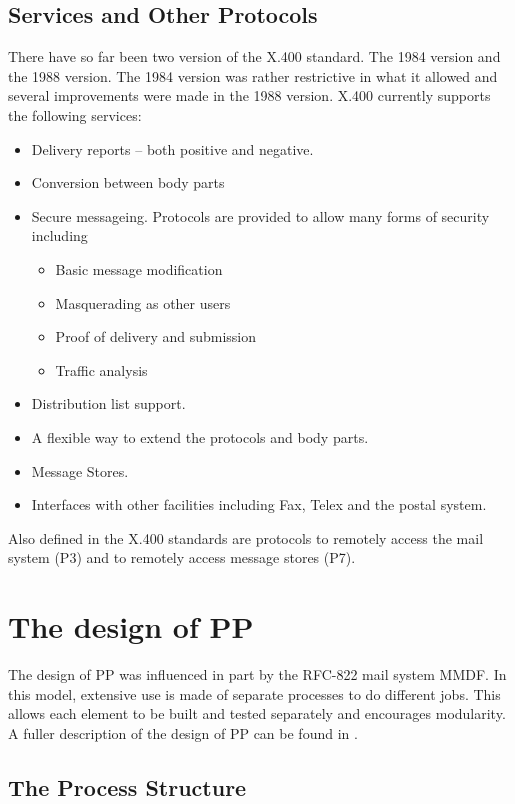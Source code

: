 \subsection{Services and Other Protocols}

There have so far been two version of the X.400 standard. The 1984
version and the 1988 version. The 1984 version was rather restrictive
in what it allowed and several improvements were made in the 1988
version. X.400 currently supports the following services:
\begin{itemize}
\item	Delivery reports -- both positive and negative.
\item	Conversion between body parts
\item	Secure messageing. Protocols are provided to allow many forms
of security including
	\begin{itemize}
	\item	Basic message modification
	\item	Masquerading as other users
	\item	Proof of delivery and submission
	\item	Traffic analysis
	\end{itemize}
\item	Distribution list support.
\item	A flexible way to extend the protocols and body parts.
\item	Message Stores.
\item	Interfaces with other facilities including Fax, Telex and the
postal system.
\end{itemize}

Also defined in the X.400 standards are protocols to remotely access
the mail system (P3) and to remotely access message stores (P7).

\section{The design of PP}

The design of PP was influenced in part by the RFC-822 mail system
MMDF\cite{MMDFII}. In this model, extensive use is made of separate
processes to do different jobs. This allows each element to be built
and tested separately and encourages modularity. A fuller description
of the design of PP can be found in \cite{PP.MTA}.

\subsection{The Process Structure}

